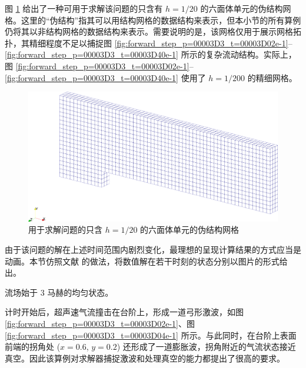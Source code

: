图 \ref{fig:forward_step_domain} 给出了一种可用于求解该问题的只含有 $h=1/20$ 的六面体单元的伪结构网格。这里的“伪结构”指其可以用结构网格的数据结构来表示，但本小节的所有算例仍将其以非结构网格的数据结构来表示。需要说明的是，该网格仅用于展示网格拓扑，其精细程度不足以捕捉图
\ref{fig:forward_step_p=00003D3_t=00003D02e-1}–\ref{fig:forward_step_p=00003D3_t=00003D40e-1}
所示的复杂流动结构。实际上，图 \ref{fig:forward_step_p=00003D3_t=00003D02e-1}–\ref{fig:forward_step_p=00003D3_t=00003D40e-1}
使用了 $h=1/200$ 的精细网格。

\begin{figure}[h!]
\begin{centering}
\includegraphics[width=1\textwidth,height=0.26\textheight,keepaspectratio]{../mdpi/figures/forward_step/mesh}
\par\end{centering}
\caption{\label{fig:forward_step_domain}用于求解问题的只含
$h=1/20$ 的六面体单元的伪结构网格}
\end{figure}

由于该问题的解在上述时间范围内剧烈变化，最理想的呈现计算结果的方式应当是动画。本节仿照文献 \cite{Woodward_1984}
的做法，将数值解在若干时刻的状态分别以图片的形式给出。

流场始于 $3$ 马赫的均匀状态。

计时开始后，超声速气流撞击在台阶上，形成一道弓形激波，如图 \ref{fig:forward_step_p=00003D3_t=00003D02e-1}、图
\ref{fig:forward_step_p=00003D3_t=00003D04e-1} 所示。与此同时，在台阶上表面前端的拐角处
($x=0.6$, $y=0.2$) 还形成了一道膨胀波，拐角附近的气流状态接近真空。因此该算例对求解器捕捉激波和处理真空的能力都提出了很高的要求。

